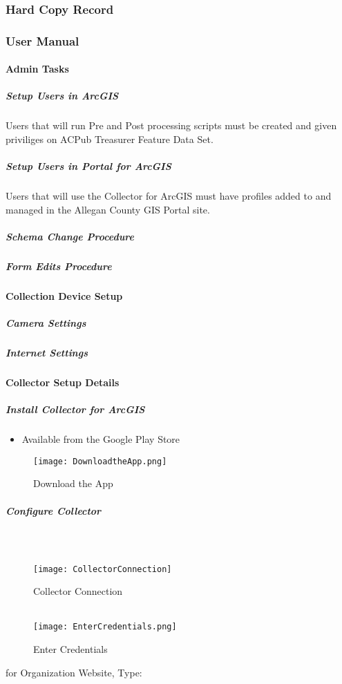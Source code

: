 \documentclass[class=article , crop=false, titlepage, twoside, multi={itemize, figure, verbatim}, float=false]{standalone}
\begin{document}
\clearpage
\subsubsection{Hard Copy Record}

\clearpage
\subsubsection{User Manual}

\paragraph{Admin Tasks}

\subparagraph{Setup Users in ArcGIS}Users that will run Pre and Post processing scripts must be created and given priviliges on ACPub Treasurer Feature Data Set.

\subparagraph{Setup Users in Portal for ArcGIS}Users that will use the Collector for ArcGIS must have profiles added to and managed in the Allegan County GIS Portal site.

\subparagraph{Schema Change Procedure}

\subparagraph{Form Edits Procedure}

\paragraph{Collection Device Setup}

\subparagraph{Camera Settings}

\subparagraph{Internet Settings}

\clearpage
\paragraph{Collector Setup Details}

\subparagraph{Install Collector for ArcGIS}
\begin{itemize}
\item Available from the Google Play Store
\end{itemize}
\begin{figure}[h!]
\centering
    \texttt{[image: DownloadtheApp.png]}
\caption{Download the App}
\end{figure}

\clearpage
\subparagraph{Configure Collector}

\subparagraph*{\\}
\begin{wrapfigure}{r}{0.5\textwidth}
\centering
\texttt{[image: CollectorConnection]}
\caption{Collector Connection}
\vspace{.25in}
\HRule \\[.4cm] %
\vspace{.25in}
\texttt{[image: EnterCredentials.png]}
\caption{Enter Credentials}
\end{wrapfigure}
for Organization Website, Type:
\vspace{.5in}
\end{document}
